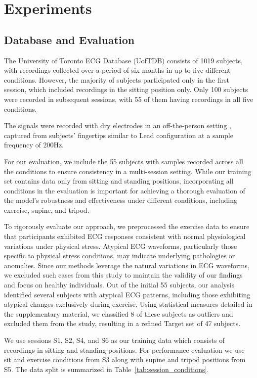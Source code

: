 \section{Experiments}
\subsection{Database and Evaluation}
The University of Toronto ECG Database (UofTDB) \cite{Wahabi2014} consists of 1019 subjects, with recordings collected over a period of six months in up to five different conditions.
However, the majority of subjects participated only in the first session, which included recordings in the sitting position only. Only 100 subjects were recorded in subsequent sessions, with 55 of them having recordings in all five conditions.

The signals were recorded with dry electrodes in an off-the-person setting \cite{8392675}, captured from subjects' fingertips similar to Lead \uppercase\expandafter{} configuration at a sample frequency of 200Hz.

For our evaluation, we include the 55 subjects with samples recorded across all the conditions to ensure consistency in a multi-session setting. While our training set contains data only from sitting and standing positions, incorporating all conditions in the evaluation is important for achieving a thorough evaluation of the model's robustness and effectiveness under different conditions, including exercise, supine, and tripod.

To rigorously evaluate our approach, we preprocessed the exercise data to ensure that participants exhibited ECG responses consistent with normal physiological variations under physical stress. Atypical ECG waveforms, particularly those specific to physical stress conditions, may indicate underlying pathologies or anomalies. Since our methods leverage the natural variations in ECG waveforms, we excluded such cases from this study to maintain the validity of our findings and focus on healthy individuals.
Out of the initial 55 subjects, our analysis identified several subjects with atypical ECG patterns, including those exhibiting atypical changes exclusively during exercise. Using statistical measures detailed in the supplementary
material, we classified 8 of these subjects as outliers and excluded them from the study, resulting in a refined Target set of 47 subjects.

We use sessions S1, S2, S4, and S6 as our training data which consists of recordings in sitting and standing positions. For performance evaluation we use sit and exercise conditions from S3 along with supine and tripod positions from S5. The data split is summarized in Table~\ref{tab:session_conditions}.

